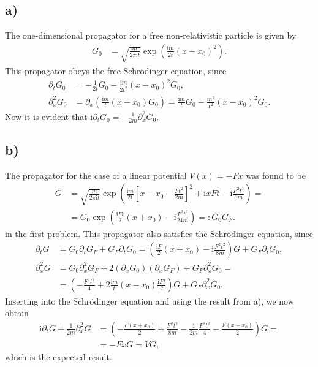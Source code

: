 \documentclass[english, parskip=full]{scrartcl}
\newcommand{\kla}{}
\newcommand{\klam}{}
\renewcommand{\i}{\text{i}}
\begin{document}
\subsection*{a)}
The one-dimensional propagator for a free non-relativistic particle is given by
\begin{align}
G_0 &= \sqrt{\frac{m}{2\pi\i t}}\exp\kla\left( \frac{\i m}{2t}(x - x_0)^2 \right).
\end{align}
This propagator obeys the free Schrödinger equation, since
\begin{align}
\partial_t G_0 &= -\frac{1}{2t} G_0 - \frac{\i m}{2t^2}(x-x_0)^2G_0,\\
\partial_x^2 G_0 &= \partial_x\kla\left( \frac{\i m}{t}(x-x_0) G_0 \right) = \frac{\i m}{t}G_0 - \frac{m^2}{t^2}(x-x_0)^2G_0.
\end{align}
Now it is evident that $\i\partial_t G_0 = -\frac{1}{2m}\partial_x^2 G_0$.

\subsection*{b)}
The propagator for the case of a linear potential $V(x) = -Fx$ was found to be 
\begin{align}
G &= \sqrt{\frac{m}{2\pi\i t}} \exp\kla\left( \frac{\i m}{2t}\klam\left[ x - x_0 - \frac{Ft^2}{2m} \right]^2 + \i x Ft - \i\frac{F^2t^3}{6m}\right) = \\
&= G_0 \exp\kla\left( \frac{\i Ft}{2}(x+x_0) - \i\frac{F^2t^3}{24m}  \right) =: G_0 G_F.
\end{align}
in the first problem. 
This propagator also satisfies the Schrödinger equation, since
\begin{align}
\partial_t G &= G_0\partial_t G_F + G_F\partial_t G_0 = \kla\left( \frac{\i F}{2}(x+x_0) - \i\frac{F^2t^2}{8m} \right)G  + G_F\partial_t G_0,\\
\partial_x^2 G &= G_0\partial_x^2 G_F + 2(\partial_xG_0)(\partial_xG_F) + G_F\partial_x^2G_0 = \\
&= \kla\left( -\frac{F^2t^2}{4} + 2\frac{\i m}{t}(x-x_0)\frac{\i Ft}{2} \right)G + G_F\partial_x^2G_0.
\end{align}
Inserting into the Schrödinger equation and using the result from a), we now obtain
\begin{align}
\i\partial_t G + \frac{1}{2m}\partial_x^2 G &= \kla\left( -\frac{F(x+x_0)}{2} + \frac{F^2t^2}{8m} - \frac{1}{2m}\frac{F^2t^2}{4} -\frac{F(x-x_0)}{2} \right)G = \\
&= -FxG = VG,
\end{align}
which is the expected result.
\end{document}
